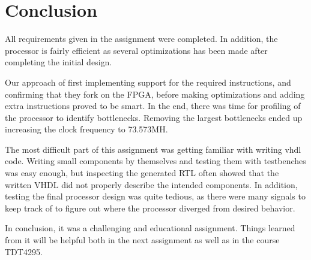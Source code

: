 \section{Conclusion}


All requirements given in the assignment were completed.
In addition, the processor is fairly efficient as several optimizations has been made after completing the initial design.

Our approach of first implementing support for the required instructions, and confirming that they fork on the FPGA, before making optimizations and adding extra instructions proved to be smart.
In the end, there was time for profiling of the processor to identify bottlenecks.
Removing the largest bottlenecks ended up increasing the clock frequency to 73.573MH.

The most difficult part of this assignment was getting familiar with writing vhdl code.
Writing small components by themselves and testing them with testbenches was easy enough,
but inspecting the generated RTL often showed that the written VHDL did not properly describe the intended components.
In addition, testing the final processor design was quite tedious, as there were many signals to keep track of to figure out where the processor diverged from desired behavior.

In conclusion, it was a challenging and educational assignment.
Things learned from it will be helpful both in the next assignment as well as in the course TDT4295.
